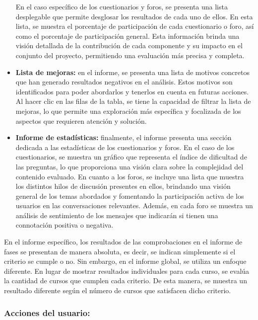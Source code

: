 \begin{itemize}
    En el caso específico de los cuestionarios y foros, se presenta una lista desplegable que permite desglosar los resultados de cada uno de ellos. En esta lista, se muestra el porcentaje de participación de cada cuestionario o foro, así como el porcentaje de participación general. Esta información brinda una visión detallada de la contribución de cada componente y su impacto en el conjunto del proyecto, permitiendo una evaluación más precisa y completa.
	\item
	\textbf{Lista de mejoras:} en el informe, se presenta una lista de motivos concretos que han generado resultados negativos en el análisis. Estos motivos son identificados para poder abordarlos y tenerlos en cuenta en futuras acciones. Al hacer clic en las filas de la tabla, se tiene la capacidad de filtrar la lista de mejoras, lo que permite una exploración más específica y focalizada de los aspectos que requieren atención y solución.
	\item
	\textbf{Informe de estadísticas:} finalmente, el informe presenta una sección dedicada a las estadísticas de los cuestionarios y foros. En el caso de los cuestionarios, se muestra un gráfico que representa el índice de dificultad de las preguntas, lo que proporciona una visión clara sobre la complejidad del contenido evaluado. En cuanto a los foros, se incluye una lista que muestra los distintos hilos de discusión presentes en ellos, brindando una visión general de los temas abordados y fomentando la participación activa de los usuarios en las conversaciones relevantes. Además, en cada foro se muestra un análisis de sentimiento de los mensajes que indicarán si tienen una connotación positiva o negativa.
\end{itemize}

En el informe específico, los resultados de las comprobaciones en el informe de fases se presentan de manera absoluta, es decir, se indican simplemente si el criterio se cumple o no. Sin embargo, en el informe global, se utiliza un enfoque diferente. En lugar de mostrar resultados individuales para cada curso, se evalúa la cantidad de cursos que cumplen cada criterio. De esta manera, se muestra un resultado diferente según el número de cursos que satisfacen dicho criterio.


\subsubsection{Acciones del usuario:}

